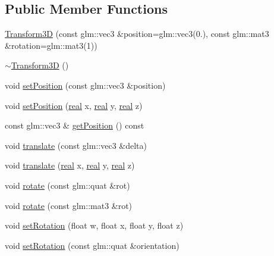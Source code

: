 \subsection*{Public Member Functions}
\begin{DoxyCompactItemize}
\item 
\mbox{\hyperlink{classr3_1_1_transform3_d_ab43888860ef5d5c124e185124cc681b5}{Transform3D}} (const glm\+::vec3 \&position=glm\+::vec3(0.), const glm\+::mat3 \&rotation=glm\+::mat3(1))
\item 
\mbox{\hyperlink{classr3_1_1_transform3_d_acb2850307abbb9733d259dba96d5ec30}{$\sim$\+Transform3D}} ()
\item 
void \mbox{\hyperlink{classr3_1_1_transform3_d_a24bf42a0f16e38b66bd6a3ecf4f026c4}{set\+Position}} (const glm\+::vec3 \&position)
\item 
void \mbox{\hyperlink{classr3_1_1_transform3_d_adae3a3bf01667c1c6c67d9a817d03a77}{set\+Position}} (\mbox{\hyperlink{namespacer3_ab2016b3e3f743fb735afce242f0dc1eb}{real}} x, \mbox{\hyperlink{namespacer3_ab2016b3e3f743fb735afce242f0dc1eb}{real}} y, \mbox{\hyperlink{namespacer3_ab2016b3e3f743fb735afce242f0dc1eb}{real}} z)
\item 
const glm\+::vec3 \& \mbox{\hyperlink{classr3_1_1_transform3_d_abe9ff86c845d54cd297ff00fd21aad71}{get\+Position}} () const
\item 
void \mbox{\hyperlink{classr3_1_1_transform3_d_a36ca89f7424b3efec3f2d5532c37f457}{translate}} (const glm\+::vec3 \&delta)
\item 
void \mbox{\hyperlink{classr3_1_1_transform3_d_aab83077fb0b382391493aa59bdd2ce13}{translate}} (\mbox{\hyperlink{namespacer3_ab2016b3e3f743fb735afce242f0dc1eb}{real}} x, \mbox{\hyperlink{namespacer3_ab2016b3e3f743fb735afce242f0dc1eb}{real}} y, \mbox{\hyperlink{namespacer3_ab2016b3e3f743fb735afce242f0dc1eb}{real}} z)
\item 
void \mbox{\hyperlink{classr3_1_1_transform3_d_aaf633209948d35ca4b90422614a84478}{rotate}} (const glm\+::quat \&rot)
\item 
void \mbox{\hyperlink{classr3_1_1_transform3_d_a802314a0dee26e4a5fb96666cd39741c}{rotate}} (const glm\+::mat3 \&rot)
\item 
void \mbox{\hyperlink{classr3_1_1_transform3_d_a78c34c186d255ad6dcd0adf7ce199c4e}{set\+Rotation}} (float w, float x, float y, float z)
\item 
void \mbox{\hyperlink{classr3_1_1_transform3_d_af539b9a5a73f5196515f9a55ee73be4d}{set\+Rotation}} (const glm\+::quat \&orientation)
\item 

\end{DoxyCompactItemize}
